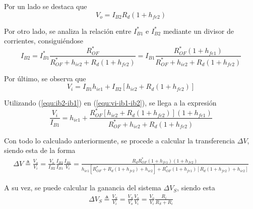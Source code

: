 Por un lado se destaca que 
\begin{equation}
	V_o = I_{B2} R_d \left( 1 + h_{fe2} \right)
\label{equ:vo-ib2}
\end{equation}

Por otro lado, se analiza la relación entre $I_{B1}^*$ e $I_{B2}^*$ mediante un divisor de corrientes, consiguiéndose
\begin{equation}
	I_{B2} = I_{B1}^* \frac{R_{OF}^*}{R_{OF}^* + h_{ie2} + R_d \left( 1 + h_{fe2} \right)} = I_{B1} \frac{R_{OF}^* \left( 1 + h_{fe1} \right)}{R_{OF}^* + h_{ie2} + R_d \left( 1 + h_{fe2} \right)} 
\label{equ:ib2-ib1}
\end{equation}

Por último, se observa que
\begin{equation}
	V_i = I_{B1} h_{ie1} + I_{B2} \left[ h_{ie2} + R_d \left( 1 + h_{fe2} \right) \right]
\label{equ:vi-ib1-ib2}
\end{equation}

Utilizando (\ref{equ:ib2-ib1}) en (\ref{equ:vi-ib1-ib2}), se llega a la expresión
\begin{equation}
	\frac{V_i}{I_{B1}} =  h_{ie1} + \frac{ R_{OF}^* \left[ h_{ie2} + R_d \left( 1 + h_{fe2} \right) \right] \left( 1 + h_{fe1} \right)}{R_{OF}^* + h_{ie2} + R_d \left( 1 + h_{fe2} \right)}
\label{equ:vi-ib1}
\end{equation}

Con todo lo calculado anteriormente, se procede a calcular la transferencia $\Delta V$, siendo esta de la forma
\begin{equation}
\begin{split}
	\Delta V \triangleq \frac{V_o}{V_i} = \frac{V_o}{I_{B2}} \frac{I_{B2}}{I_{B1}} \frac{I_{B1}}{V_i} = \frac{R_d R_{OF}^* \left( 1 + h_{fe1} \right) \left( 1 + h_{fe2} \right)}{ h_{ie1} \left[ R_{OF}^* + R_d \left( 1 + h_{fe2} \right) + h_{ie2} \right] + R_{OF}^* \left( 1 + h_{fe1} \right) \left[ R_d \left( 1 + h_{fe2} \right) + h_{ie2} \right]}
\end{split}
\label{equ:v}
\end{equation}

A su vez, se puede calcular la ganancia del sistema $\Delta V_S$, siendo esta
\begin{equation}
\begin{split}
	\Delta V_S \triangleq \frac{V_S}{V_i} = \frac{V_S}{V_o} \frac{V_o}{V_i} = \frac{V_o}{V_i} \frac{R_i}{R_S + R_i}
\end{split}
\label{equ:vs}
\end{equation}

